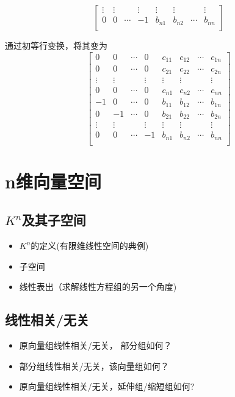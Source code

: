 \begin{itemize}
\begin{equation*}
\begin{bmatrix}
		\vdots& \vdots& & \vdots&\vdots& \vdots&        &\vdots\\
		 0& 0& \cdots& -1&b_{n1}& b_{n2}& \cdots &b_{nn}\\
	\end{bmatrix}
	\end{equation*}
	\begin{solution}
	通过初等行变换，将其变为
	\begin{equation*}
	\begin{bmatrix}
	        0 &  0 & \cdots & 0 &c_{11} &c_{12} &\cdots &c_{1n}\\
		    0 &  0 & \cdots & 0 &c_{21} &c_{22} &\cdots &c_{2n}\\
		\vdots& \vdots&        &\vdots &\vdots &\vdots & &\vdots\\
		    0 & 0& \cdots &0 &c_{n1} &c_{n2} & \cdots &c_{nn}\\
		-1& 0& \cdots& 0&b_{11}& b_{12}& \cdots &b_{1n}\\
		 0&-1& \cdots& 0&b_{21}& b_{22}& \cdots &b_{2n}\\
		\vdots& \vdots& & \vdots&\vdots& \vdots&        &\vdots\\
		 0& 0& \cdots& -1&b_{n1}& b_{n2}& \cdots &b_{nn}\\
	\end{bmatrix}
	\end{equation*}
	\end{solution}
	\vspace{4cm}
\end{itemize}

\chapter{n维向量空间}

\section{$K^n$及其子空间}
\begin{itemize}
    \item $K^n$的定义(有限维线性空间的典例)
	\item 子空间
	\item 线性表出（求解线性方程组的另一个角度)
\end{itemize}

\section{线性相关/无关}
\begin{itemize}
	\item 原向量组线性相关/无关， 部分组如何？
	\item 部分组线性相关/无关，该向量组如何？
	\item 原向量组线性相关/无关，延伸组/缩短组如何?
\end{itemize}

